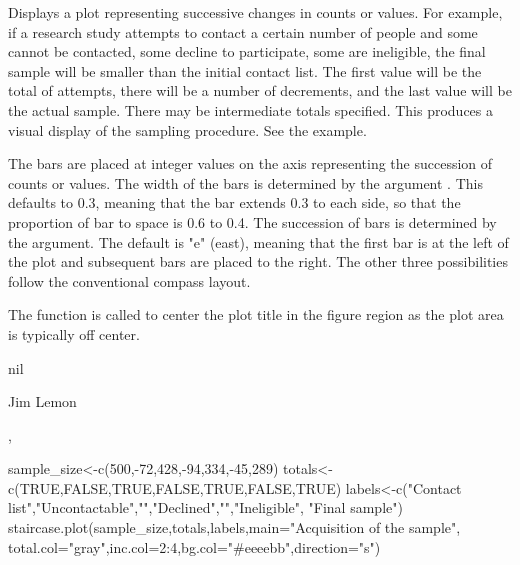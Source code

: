 \begin{Details}\relax
Displays a plot representing successive changes in counts or values. For example,
if a research study attempts to contact a certain number of people and some
cannot be contacted, some decline to participate, some are ineligible, the final
sample will be smaller than the initial contact list. The first value will be the
total of attempts, there will be a number of decrements, and the last value will
be the actual sample. There may be intermediate totals specified. This produces
a visual display of the sampling procedure. See the example.

The bars are placed at integer values on the axis representing the succession of
counts or values. The width of the bars is determined by the argument
. This defaults to 0.3, meaning that the bar extends 0.3 to each
side, so that the proportion of bar to space is 0.6 to 0.4. The succession of
bars is determined by the  argument. The default is "e" (east),
meaning that the first bar is at the left of the plot and subsequent bars are
placed to the right. The other three possibilities follow the conventional
compass layout.

The  function is called to center the plot title in the figure
region as the plot area is typically off center.
\end{Details}
\begin{Value}
nil
\end{Value}
\begin{Author}\relax
Jim Lemon
\end{Author}
\begin{SeeAlso}\relax
{}, 
\end{SeeAlso}
\begin{Examples}
\begin{ExampleCode}
 sample_size<-c(500,-72,428,-94,334,-45,289)
 totals<-c(TRUE,FALSE,TRUE,FALSE,TRUE,FALSE,TRUE)
 labels<-c("Contact list","Uncontactable","","Declined","","Ineligible",
  "Final sample")
 staircase.plot(sample_size,totals,labels,main="Acquisition of the sample",
  total.col="gray",inc.col=2:4,bg.col="#eeeebb",direction="s")
\end{ExampleCode}
\end{Examples}

